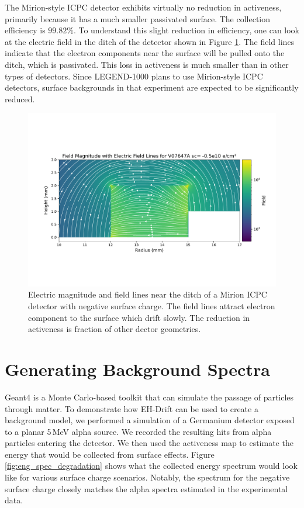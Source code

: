 The Mirion-style ICPC detector exhibits virtually no reduction in activeness, primarily because it has a much smaller passivated surface. The collection efficiency is $99.82\%$. To understand this slight reduction in efficiency, one can look at the electric field in the ditch of the detector shown in Figure \ref{ch5_fig_elect_field_lines_surface_V07647A}. The field lines indicate that the electron components near the surface will be pulled onto the ditch, which is passivated. This loss in activeness is much smaller than in other types of detectors. Since LEGEND-1000 plans to use Mirion-style ICPC detectors, surface backgrounds in that experiment are expected to be significantly reduced.

\begin{figure}%
\centering
\includegraphics[trim={0cm 3cm 0cm 4.69cm},clip,width=0.99\linewidth]{ch5/figs/elect_field_lines_surface_V07647A_sc_-0.5.pdf}
\caption{Electric magnitude and field lines near the ditch of a Mirion ICPC detector with negative surface charge. The field lines attract electron component to the surface which drift slowly. The reduction in activeness is fraction of other dector geometries.}
\label{ch5_fig_elect_field_lines_surface_V07647A}
\end{figure}


\section{\label{res:3} Generating Background Spectra}

Geant4 is a Monte Carlo-based toolkit that can simulate the passage of particles through matter. To demonstrate how EH-Drift can be used to create a background model, we performed a {\geant} simulation of a Germanium detector exposed to a planar 5\,MeV alpha source. We recorded the resulting hits from alpha particles entering the detector. We then used the activeness map to estimate the energy that would be collected from surface effects. Figure \ref{fig:eng_spec_degradation} shows what the collected energy spectrum would look like for various surface charge scenarios. Notably, the spectrum for the negative surface charge closely matches the alpha spectra estimated in the experimental data.


